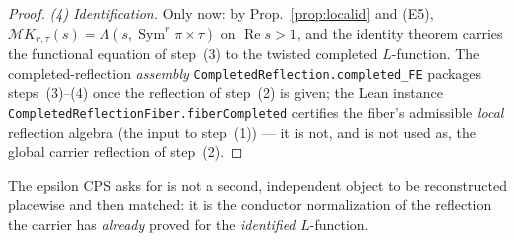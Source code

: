 \documentclass[11pt]{article}
\theoremstyle{definition}
\renewcommand{\Re}{\operatorname{Re}}
\newcommand{\Sym}{\operatorname{Sym}}
\begin{document}
\begin{proof}
\emph{(4) Identification.} Only now: by Prop.~\ref{prop:localid} and \textup{(E5)},
$\mathcal M K_{r,\tau}(s)=\Lambda(s,\Sym^r\pi\times\tau)$ on $\Re s>1$, and the identity theorem carries
the functional equation of step~(3) to the twisted completed $L$-function. The completed-reflection
\emph{assembly} \texttt{CompletedReflection.completed\_FE} packages steps~(3)--(4) once the reflection of
step~(2) is given; the Lean instance \texttt{CompletedReflectionFiber.fiberCompleted} certifies the fiber's
admissible \emph{local} reflection algebra (the input to step~(1)) --- it is not, and is not used as, the
global carrier reflection of step~(2).
\end{proof}

\noindent The epsilon CPS asks for is not a second, independent object to be reconstructed placewise and then
matched: it is the conductor normalization of the reflection the carrier has \emph{already} proved for the
\emph{identified} $L$-function.
\end{document}
